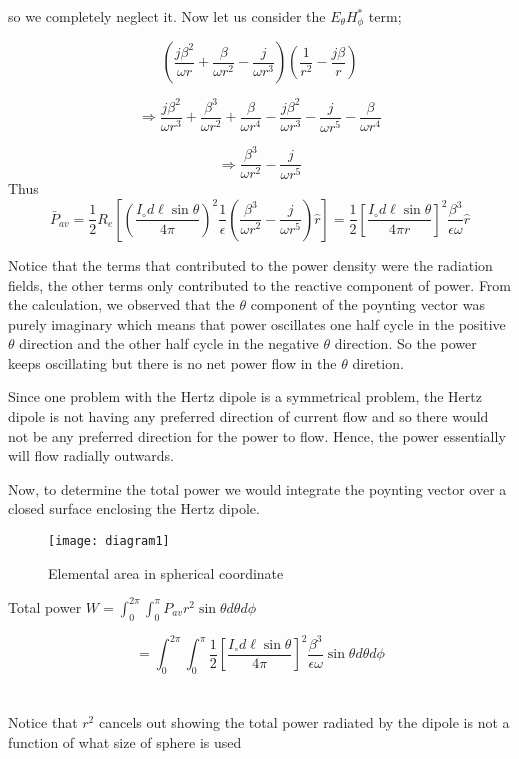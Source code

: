     so we completely neglect it. Now let us consider the $E_\theta H_\phi^*$ term;
  
    $$\left(\dfrac{j\beta^2}{\omega r} + \dfrac{\beta}{\omega r^2} - \dfrac{j}{\omega r^3}\right)\left(\dfrac{1}{r^2} - \dfrac{j\beta}{r}\right)$$
    
    $$\Longrightarrow \dfrac{j\beta^2}{\omega r^3} 
    + \dfrac{\beta^3}{\omega r^2} + \dfrac{\beta}{\omega r^4} 
    - \dfrac{j\beta^2}{\omega r^3} - \dfrac{j}{\omega r^5}
    - \dfrac{\beta}{\omega r^4}$$
    
    $$\Longrightarrow \dfrac{\beta^3}{\omega r^2} - \dfrac{j}{\omega r^5}$$
    Thus \quad  
   \begin{dmath*}
   	 \bar{P}_{av} = \dfrac{1}{2}\mathit{R_e}\left[\left(\dfrac{I_\circ d\ell\sin\theta}{4\pi}\right)^2\dfrac{1}{\epsilon} \left(\dfrac{\beta^3}{\omega r^2} - \dfrac{j}{\omega r^5}\right)\hat{r}\right]
   	= \dfrac{1}{2}
   	\left[\dfrac{I_\circ d\ell\sin\theta}{4\pi r}\right]^2 \dfrac{\beta^3}{\epsilon\omega}\hat{r} 
   \end{dmath*}

Notice that the terms that contributed to the power density were the radiation fields, the other terms only contributed to the reactive component of power. From the calculation, we observed that the $\theta$  component of the poynting vector was purely imaginary which means that power oscillates one half cycle in the positive $\theta$ direction and the other half cycle in the negative $\theta$ direction. So the power keeps oscillating but there is no net power flow in the $\theta$ diretion.

Since one problem with the Hertz dipole is a symmetrical problem, the Hertz dipole is not having any preferred direction of current flow and so there would not be any preferred direction for the power to flow. Hence, the power essentially will flow radially outwards.

Now, to determine the total power we would integrate the poynting vector over a closed surface enclosing the Hertz dipole.
\begin{figure}[h]
	\centering
	\texttt{[image: diagram1]}
	\caption{Elemental area in spherical coordinate}
	\label{figure12}
\end{figure}

Total power $ W = \int^{2\pi}_0 \int^\pi_0 P_{av}r^2\sin\theta d\theta d\phi $

$$
= \int^{2\pi}_0\int^\pi_0 \dfrac{1}{2}
\left[\dfrac{I_\circ d\ell\sin\theta}{4\pi}\right]^2\dfrac{\beta^3}{\epsilon\omega}\sin\theta d\theta d\phi
$$
\\\\
Notice that $r^2$ cancels out showing the total power radiated by the dipole is not a function of what size of sphere is used

